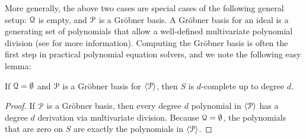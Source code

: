 \begin{remark}
	More generally, the above two cases are special cases of the following general setup: $\mathcal Q$ is empty, and $\mathcal P$ is a Gr\"obner basis. A Gr\"obner basis for an ideal is a generating set of polynomials that allow a well-defined multivariate polynomial division (see \cite{Grobner} for more information). Computing the Gr\"obner basis is often the first step in practical polynomial equation solvers, and we note the following easy lemma:
\begin{lemma}\label{lem:grobner}
If $\mathcal Q = \emptyset$ and $\mathcal P$ is a Gr\"obner basis for $\langle \mathcal P\rangle$, then $S$ is $d$-complete up to degree $d$. 
\end{lemma}
\begin{proof}
If $\mathcal P$ is a Gr\"obner basis, then every degree $d$ polynomial in $\langle \mathcal P\rangle$ has a degree $d$ derivation via multivariate division. Because $\mathcal Q = \emptyset$, the polynomials that are zero on $S$ are exactly the polynomials in $\langle \mathcal P\rangle$. 
\end{proof}

\end{remark}

%
%


